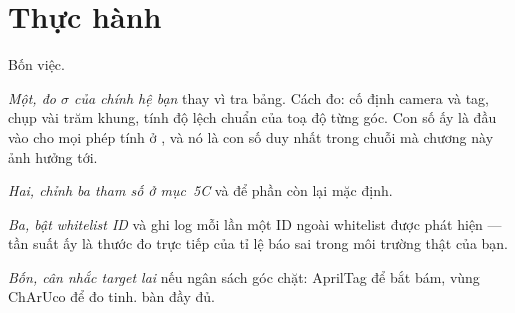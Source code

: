 \documentclass[../../marker.tex]{subfiles}
\begin{document}
\section{Thực hành}

Bốn việc.

\emph{Một, đo \(\sigma\) của chính hệ bạn} thay vì tra bảng. Cách đo: cố định camera và tag, chụp vài trăm khung, tính độ lệch chuẩn của toạ độ từng góc. Con số ấy là đầu vào cho mọi phép tính ở , và nó là con số duy nhất trong chuỗi mà chương này ảnh hưởng tới.

\emph{Hai, chỉnh ba tham số ở mục~5C} và để phần còn lại mặc định.

\emph{Ba, bật whitelist ID} và ghi log mỗi lần một ID ngoài whitelist được phát hiện --- tần suất ấy là thước đo trực tiếp của tỉ lệ báo sai trong môi trường thật của bạn.

\emph{Bốn, cân nhắc target lai} nếu ngân sách góc chặt: AprilTag để bắt bám, vùng ChArUco để đo tinh.  bàn đầy đủ.
\end{document}
